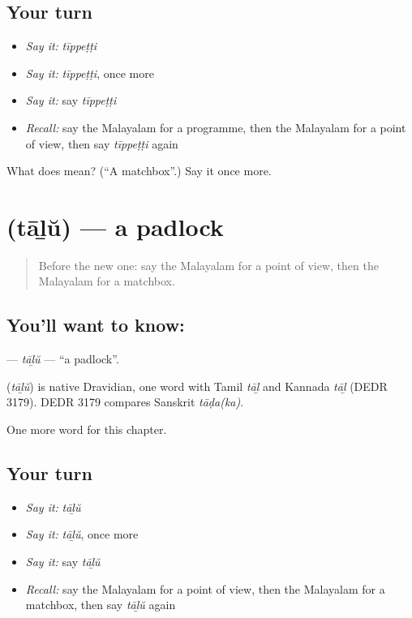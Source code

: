 \subsection*{Your turn}
\begin{itemize}
\raggedright
  \item \emph{Say it:} \emph{tīppeṭṭi}
  \item \emph{Say it:} \emph{tīppeṭṭi}, once more
  \item \emph{Say it:} say \emph{tīppeṭṭi}
  \item \emph{Recall:} say the Malayalam for a programme, then the Malayalam for a point of view, then say \emph{tīppeṭṭi} again
\end{itemize}

\begin{tcolorbox}[breakable,colback=teal!4,colframe=teal!35!black,title={Before you move on}]
What does  mean? (\textquotedblleft{}A matchbox\textquotedblright{}.) Say it once more.
\end{tcolorbox}
\section[\texorpdfstring{\ml{താഴ്} (tāḻŭ)}{താഴ് (tāḻŭ)}]{ (tāḻŭ) — a padlock}

\label{lesson:ML-C294-talu}



\begin{quote}
Before the new one: say the Malayalam for a point of view, then the Malayalam for a matchbox.
\end{quote}

\subsection*{You'll want to know: }
\textbf{} — \emph{tāḻŭ} — \textquotedblleft{}a padlock\textquotedblright{}.

\begin{cousinweb}
\textbf{} (\emph{tāḻŭ}) is native Dravidian, one word with Tamil \emph{tāḻ} and Kannada \emph{tāḻ} (DEDR 3179). DEDR 3179 compares Sanskrit \emph{tāḍa(ka)}.
\end{cousinweb}

\begin{grammarlens}[title={What you've built}]
One more word for this chapter.
\end{grammarlens}

\subsection*{Your turn}
\begin{itemize}
\raggedright
  \item \emph{Say it:} \emph{tāḻŭ}
  \item \emph{Say it:} \emph{tāḻŭ}, once more
  \item \emph{Say it:} say \emph{tāḻŭ}
  \item \emph{Recall:} say the Malayalam for a point of view, then the Malayalam for a matchbox, then say \emph{tāḻŭ} again
\end{itemize}


